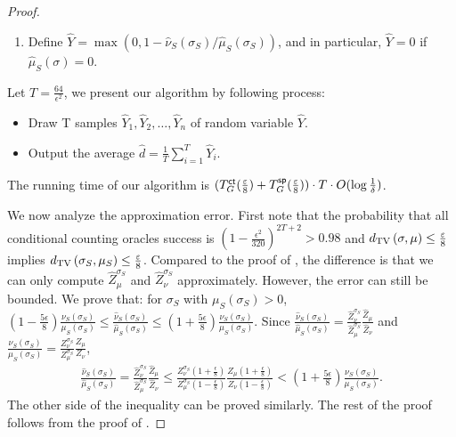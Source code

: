\begin{proof}
\begin{enumerate}
\item Define $\hat{Y}=\max\left (0,1-\hat{\nu}_S(\sigma_S)/\hat{\mu}_S(\sigma_S) \right )$, and in particular, $\hat{Y}=0$ if $\hat{\mu}_S(\sigma)=0$.
\end{enumerate}
Let $T=\frac{64}{\epsilon^2}$, we present our algorithm by following process:

\begin{itemize}
\item Draw T samples $\hat{Y}_1,\hat{Y}_2,\dots,\hat{Y}_n$ of random variable $\hat{Y}$.

\item Output the average $\hat{d}=\frac{1}{T}\sum_{i=1}^{T}\hat{Y}_i$.
\end{itemize}

The running time of our algorithm is $(T^{\textsf{ct}}_{G}(\frac{\varepsilon}{8})+T^{\textsf{sp}}_{G}(\frac{\varepsilon}{8}))\cdot T \cdot O(\log \frac{1}{\delta})$.


We now analyze the approximation error. First note that the probability that all conditional counting oracles success is $(1-\frac{\epsilon^2}{320})^{2T+2}>0.98$ and $d_{\mathrm{TV}}\left({\sigma},{\mu}\right)\leq \frac{\varepsilon}{8}$ implies $d_{\mathrm{TV}}\left({\sigma_S},{\mu_S}\right)\leq \frac{\varepsilon}{8}$. 
Compared to the proof of , the difference is that we can only compute $\hat{Z}_\mu^{\sigma_S}$ and $\hat{Z}_\nu^{\sigma_S}$ approximately. However, the error can still be bounded. 
We prove that: for $\sigma_S$ with $\mu_S(\sigma_S)>0$, $\left(1-\frac{5\epsilon}{8} \right)\frac{\nu_S(\sigma_S)}{\mu_S(\sigma_S)}\leq \frac{\hat{\nu}_S(\sigma_S)}{\hat{\mu}_S(\sigma_S)}\leq \left ( 1+\frac{5\epsilon}{8} \right ) \frac{\nu_S(\sigma_S)}{\mu_S(\sigma_S)}$. Since $\frac{\hat{\nu}_S(\sigma_S)}{\hat{\mu}_S(\sigma_S)}= \frac{\hat{Z}_\nu^{\sigma_S}}{\hat{Z}_\mu^{\sigma_S}}\frac{\hat{Z}_{\mu}}{\hat{Z}_{\nu}}$ and $\frac{\nu_S(\sigma_S)}{\mu_S(\sigma_S)}= \frac{Z_\nu^{\sigma_S}}{Z_\mu^{\sigma_S}}\frac{Z_{\mu}}{Z_{\nu}}$,
\begin{align*}
    \frac{\hat{\nu}_S(\sigma_S)}{\hat{\mu}_S(\sigma_S)}= \frac{\hat{Z}_\nu^{\sigma_S}}{\hat{Z}_\mu^{\sigma_S}}\frac{\hat{Z}_{\mu}}{\hat{Z}_{\nu}}
    \leq \frac{Z_\nu^{\sigma_S}(1+\frac{\epsilon}{8})}{Z_\mu^{\sigma_S}(1-\frac{\epsilon}{8})}\frac{Z_{\mu}(1+\frac{\epsilon}{8})}{Z_{\nu}(1-\frac{\epsilon}{8})}< \left(1+\frac{5\epsilon}{8}\right)\frac{\nu_S(\sigma_S)}{\mu_S(\sigma_S)}.
\end{align*}
The other side of the inequality can be proved similarly. The rest of the proof follows from the proof of . 
\end{proof}


